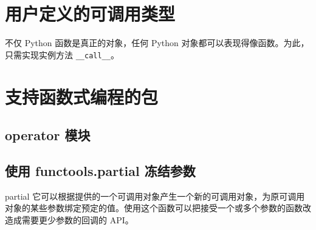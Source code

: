 \section{用户定义的可调用类型}
不仅 Python 函数是真正的对象，任何 Python 对象都可以表现得像函数。为此，只需实现实例方法 \verb|__call__|。
\section{支持函数式编程的包}
\subsection{operator 模块}
\subsection{使用 functools.partial 冻结参数}
partial 它可以根据提供的一个可调用对象产生一个新的可调用对象，为原可调用对象的某些参数绑定预定的值。使用这个函数可以把接受一个或多个参数的函数改造成需要更少参数的回调的 API。
